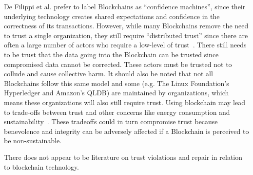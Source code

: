 \documentclass{article}
\newcommand{\brendan}[1]{\textcolor{blue}{}}
\begin{document}
De Filippi et al. prefer to label Blockchains as ``confidence machines'', since their underlying technology creates shared expectations and confidence in the correctness of its transactions.
However, while many Blockchains remove the need to trust a single organization, they still require ``distributed trust'' since there are often a large number of actors who require a low-level of trust~\cite{de2020blockchain}. There still needs to be trust that the data going into the Blockchain can be trusted since compromised data cannot be corrected. These actors must be trusted not to collude and cause collective harm. It should also be noted that not all Blockchains follow this same model and some (e.g. The Linux Foundation's Hyperledger and Amazon's QLDB) are maintained by organizations, which means these organizations will also still require trust. Using blockchain may lead to trade-offs between trust and other concerns like energy consumption and sustainability~\cite{sedlmeir2020energy}. These tradeoffs could in turn compromise trust because benevolence and integrity can be adversely affected if a Blockchain is perceived to be non-sustainable. 

There does not appear to be literature on trust violations and repair in relation to blockchain technology.

\brendan{If I could conclude by where I started on our overall commitment to Mātauranga Maori and data/ computer/ trust etc By doing so it could take us on quite a remarkable journey of exploring the topic of this paper and subsequent interrelated topics like fairness, accountability obligation etc 
Thanks}



\end{document}
